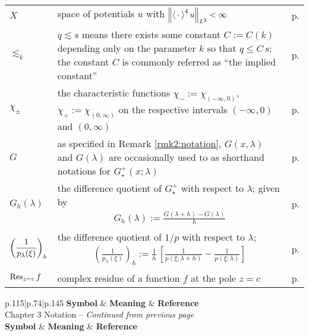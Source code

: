 \documentclass[../dissertation.tex]{subfiles}
\begin{document}
\begin{centering}
\begin{longtable}{R{.115\textwidth}|L{.74\textwidth}|C{.145\textwidth}}
		$X$ & space of potentials $u$ with $\left\| \left\langle \kern 0.5ex \cdot \kern 0.5ex \right\rangle^{4} u \right\|_{L^2} < \infty$
			& p.\pageref{defn2:X} \\
		$\lesssim_k$ & $q \lesssim s$ means there exists some constant
				$C := C(k)$ depending only on the parameter $k$ so that
				$q \leq C \, s$; the constant $C$ is commonly referred as ``the 
				implied constant''  
			& p.\pageref{ILW.GL.bdp} \\
		$\chi_\pm$ & the characteristic functions $\chi_-:= \chi_{(-\infty, 0)}$, 
				$\chi_+:= \chi_{(0, \infty)}$ on the respective intervals
				$(-\infty, 0)$ and $(0, \infty)$
			& p.\pageref{sym2:chipm} \\
		$G$ & as specified in Remark \ref{rmk2:notation}, $G(x,\lambda)$ 
				and $G(\lambda)$ are occasionally used to as shorthand 
				notations for $G_\star^+(x; \lambda)$
			& p.\pageref{rmk2:notation} \\
		$G_h(\lambda)$ & the difference quotient of $G_\star^+$ with respect to 
				$\lambda$; given by 
				\begin{align*}
					G_h(\lambda) := \frac{G(\lambda+h) - G(\lambda)}{h}
				\end{align*}
			& p.\pageref{sym2:Gh} \\
		$\displaystyle\left(\frac{1}{p_\lambda(\xi)}\right)_{h}$
			& the difference quotient of $1/p$ with respect to $\lambda$;
				\begin{align*}
					\left(\frac{1}{p_\lambda(\xi)}\right)_{h}
						:= \frac{1}{h}\,
							\left[
								\frac{1}{p(\xi; \lambda +h)}
								-\frac{1}{p(\xi; \lambda)}
							\right]
				\end{align*}
			& p.\pageref{sym2:pdiffquot} \\
		$\operatorname{Res}_{z=c}f$ & complex residue of a function $f$ at the pole $z = c$
			& p.\pageref{eq2:gzerores}
	\end{longtable}
\end{centering}



\begin{centering}
\begin{longtable}{R{.115\textwidth}|L{.74\textwidth}|C{.145\textwidth}}
	\textbf{Symbol} & \textbf{Meaning} & \textbf{Reference} \\
	\hline                                      
	\endfirsthead
	{Chapter 3 Notation -- \textit{Continued from previous page}} \\
	\hline
	\textbf{Symbol} & \textbf{Meaning} & \textbf{Reference} \\
	\hline
	\endhead
	\hline {} \\
	\endfoot
	\hline
	\endlastfoot

\end{longtable}
\end{centering}
\end{document}
